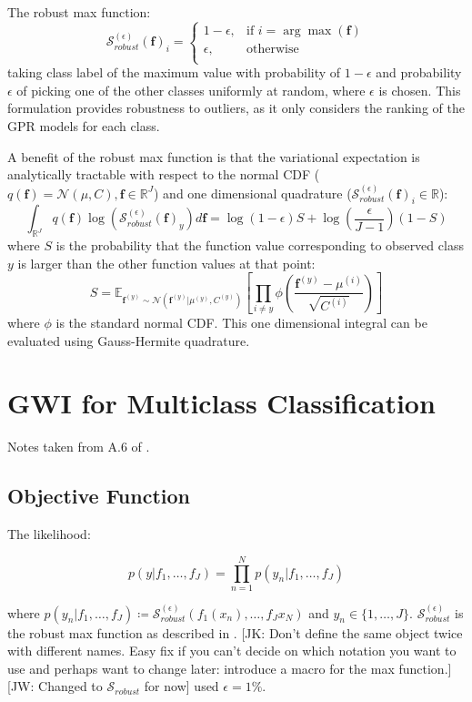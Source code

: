 \documentclass[twoside,11pt]{article}
\newcommand{\jk}[1]{{\color{blue} [JK: #1]}}
\newcommand{\jw}[1]{{\color{gray} [JW: #1]}}
\begin{document}
The robust max function:
\[\mathcal{S}_{robust}^{(\epsilon)}(\mathbf{f})_i = \begin{cases}
      1-\epsilon, &  \text{if } i = \arg \max(\mathbf{f}) \\
      \epsilon, & \text{otherwise} \\
   \end{cases}\]
taking class label of the maximum value with probability of $1-\epsilon$ and probability $\epsilon$ of picking one of the other classes uniformly at random, where $\epsilon$ is chosen.
This formulation provides robustness to outliers, as it only considers the ranking of the GPR models for each class.

A benefit of the robust max function is that the variational expectation is analytically tractable with respect to the normal CDF ($q(\mathbf{f}) = \mathcal{N}(\mu, C), \mathbf{f} \in \mathbb{R}^J$) and one dimensional quadrature ($\mathcal{S}_{robust}^{(\epsilon)}(\mathbf{f})_i \in \mathbb{R}$):
\[\int_{\mathbb{R}^J} q(\mathbf{f}) \log(\mathcal{S}_{robust}^{(\epsilon)}(\mathbf{f})_y) d\textbf{f} = \log(1-\epsilon) S + \log\left(\frac{\epsilon}{J-1}\right)(1-S)\]
where $S$ is the probability that the function value corresponding to observed class $y$ is larger than the other function values at that point:
\[S = \mathbb{E}_{\mathbf{f}^{(y)} \sim \mathcal{N}(\mathbf{f}^{(y)} | \mu^{(y)}, C^{(y)})} \left[\prod_{i \neq y} \phi \left(\frac{\textbf{f}^{(y)}-\mu^{(i)}}{\sqrt{C^{(i)}}} \right)\right]\]
where $\phi$ is the standard normal CDF. This one dimensional integral can be evaluated using Gauss-Hermite quadrature.


\section{GWI for Multiclass Classification}\label{sec:gwi-for-multiclass-classification}
Notes taken from A.6 of \cite{wild2022generalized}.

\subsection{Objective Function}\label{subsec:gwi-for-multiclass-classification-objective-function}

The likelihood:

\[p(y|f_1, \dots, f_J) = \prod_{n=1}^N p(y_n | f_1, \dots, f_J)\]

where $p(y_n | f_1, \dots, f_J) \coloneqq \mathcal{S}_{robust}^{(\epsilon)}(f_1(x_n), \dots , f_J{x_N})$ and $y_n \in \{1, \dots, J\}$.
$\mathcal{S}_{robust}^{(\epsilon)}$ is the robust max function as described in \cite{matthews2017scalable}.
%
\jk{Don't define the same object twice with different names. Easy fix if you can't decide on which notation you want to use and perhaps want to change later: introduce a macro for the max function.}
%
%
\jw{Changed to $\mathcal{S}_{robust}$ for now}
%
\cite{wild2022generalized} used $\epsilon = 1 \%$.
\end{document}
